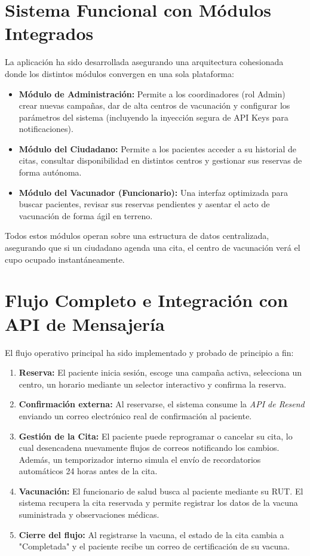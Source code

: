 \documentclass[12pt,a4paper]{article}
\begin{document}
\section{Sistema Funcional con Módulos Integrados}
La aplicación ha sido desarrollada asegurando una arquitectura cohesionada donde los distintos módulos convergen en una sola plataforma:
\begin{itemize}
    \item \textbf{Módulo de Administración:} Permite a los coordinadores (rol Admin) crear nuevas campañas, dar de alta centros de vacunación y configurar los parámetros del sistema (incluyendo la inyección segura de API Keys para notificaciones).
    \item \textbf{Módulo del Ciudadano:} Permite a los pacientes acceder a su historial de citas, consultar disponibilidad en distintos centros y gestionar sus reservas de forma autónoma.
    \item \textbf{Módulo del Vacunador (Funcionario):} Una interfaz optimizada para buscar pacientes, revisar sus reservas pendientes y asentar el acto de vacunación de forma ágil en terreno.
\end{itemize}
Todos estos módulos operan sobre una estructura de datos centralizada, asegurando que si un ciudadano agenda una cita, el centro de vacunación verá el cupo ocupado instantáneamente.

\section{Flujo Completo e Integración con API de Mensajería}
El flujo operativo principal ha sido implementado y probado de principio a fin:
\begin{enumerate}
    \item \textbf{Reserva:} El paciente inicia sesión, escoge una campaña activa, selecciona un centro, un horario mediante un selector interactivo y confirma la reserva.
    \item \textbf{Confirmación externa:} Al reservarse, el sistema consume la \textit{API de Resend} enviando un correo electrónico real de confirmación al paciente.
    \item \textbf{Gestión de la Cita:} El paciente puede reprogramar o cancelar su cita, lo cual desencadena nuevamente flujos de correos notificando los cambios. Además, un temporizador interno simula el envío de recordatorios automáticos 24 horas antes de la cita.
    \item \textbf{Vacunación:} El funcionario de salud busca al paciente mediante su RUT. El sistema recupera la cita reservada y permite registrar los datos de la vacuna suministrada y observaciones médicas.
    \item \textbf{Cierre del flujo:} Al registrarse la vacuna, el estado de la cita cambia a "Completada" y el paciente recibe un correo de certificación de su vacuna.
\end{enumerate}
\end{document}
